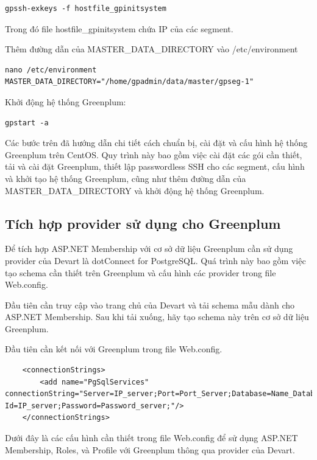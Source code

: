 \documentclass[14pt]{article}
\begin{document}
\begin{verbatim}
gpssh-exkeys -f hostfile_gpinitsystem
\end{verbatim}

Trong đó file hostfile\_gpinitsystem chứa IP của các segment.

Thêm đường dẫn của MASTER\_DATA\_DIRECTORY vào /etc/environment

\begin{verbatim}
nano /etc/environment
MASTER_DATA_DIRECTORY="/home/gpadmin/data/master/gpseg-1"
\end{verbatim}

Khởi động hệ thống Greenplum:

\begin{verbatim}
gpstart -a
\end{verbatim}

Các bước trên đã hướng dẫn chi tiết cách chuẩn bị, cài đặt và cấu hình hệ thống Greenplum trên CentOS. Quy trình này bao gồm việc cài đặt các gói cần thiết, tải và cài đặt Greenplum, thiết lập passwordless SSH cho các segment, cấu hình và khởi tạo hệ thống Greenplum, cũng như thêm đường dẫn của MASTER\_DATA\_DIRECTORY và khởi động hệ thống Greenplum.



\subsection{Tích hợp provider sử dụng cho Greenplum}

Để tích hợp ASP.NET Membership với cơ sở dữ liệu Greenplum cần sử dụng provider của Devart là dotConnect for PostgreSQL. Quá trình này bao gồm việc tạo schema cần thiết trên Greenplum và cấu hình các provider trong file Web.config.

Đầu tiên cần truy cập vào trang chủ của Devart và tải schema mẫu dành cho ASP.NET Membership. Sau khi tải xuống, hãy tạo schema này trên cơ sở dữ liệu Greenplum.

Đầu tiên cần kết nối với Greenplum trong file Web.config.

\begin{verbatim}
	<connectionStrings>
		<add name="PgSqlServices" connectionString="Server=IP_server;Port=Port_Server;Database=Name_Database;User Id=IP_server;Password=Password_server;"/>
	</connectionStrings>
\end{verbatim}

Dưới đây là các cấu hình cần thiết trong file Web.config để sử dụng ASP.NET Membership, Roles, và Profile với Greenplum thông qua provider của Devart.
\end{document}
